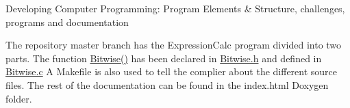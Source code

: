 Developing Computer Programming\+: Program Elements \& Structure, challenges, programs and documentation

The repository master branch has the Expression\+Calc program divided into two parts. The function \hyperlink{_bitwise_8c_a1069f717b1478dfc4f451a08a1690884}{Bitwise()} has been declared in \hyperlink{_bitwise_8h}{Bitwise.\+h} and defined in \hyperlink{_bitwise_8c}{Bitwise.\+c} A Makefile is also used to tell the complier about the different source files. The rest of the documentation can be found in the index.\+html Doxygen folder. 